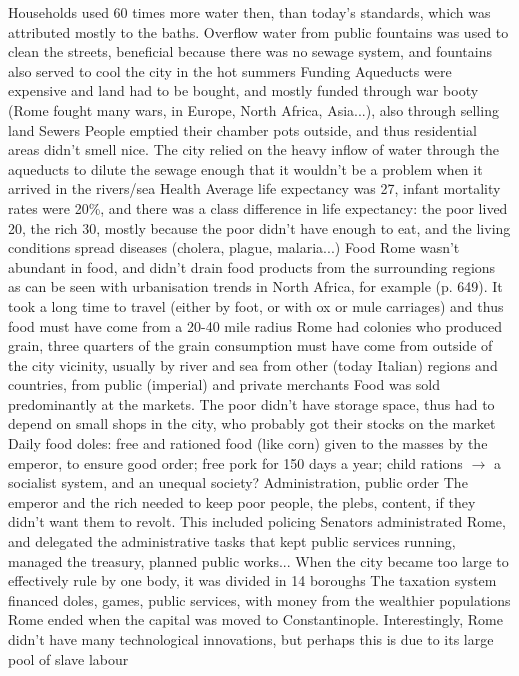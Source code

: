 \documentclass{article}
\begin{document}
\begin{outline}
		\2 Households used 60 times more water then, than today's standards, which was attributed mostly to the baths. Overflow water from public fountains was used to clean the streets, beneficial because there was no sewage system, and fountains also served to cool the city in the hot summers
	\1 Funding
		\2 Aqueducts were expensive and land had to be bought, and mostly funded through war booty (Rome fought many wars, in Europe, North Africa, Asia...), also through selling land
	\1 Sewers
		\2 People emptied their chamber pots outside, and thus residential areas didn't smell nice. The city relied on the heavy inflow of water through the aqueducts to dilute the sewage enough that it wouldn't be a problem when it arrived in the rivers/sea
	\1 Health
		\2 Average life expectancy was 27, infant mortality rates were 20\%, and there was a class difference in life expectancy: the poor lived 20, the rich 30, mostly because the poor didn't have enough to eat, and the living conditions spread diseases (cholera, plague, malaria...)
	\1 Food
		\2 Rome wasn't abundant in food, and didn't drain food products from the surrounding regions as can be seen with urbanisation trends in North Africa, for example (p. 649). It took a long time to travel (either by foot, or with ox or mule carriages) and thus food must have come from a 20-40 mile radius
		\2 Rome had colonies who produced grain, three quarters of the grain consumption must have come from outside of the city vicinity, usually by river and sea from other (today Italian) regions and countries, from public (imperial) and private merchants
		\2 Food was sold predominantly at the markets. The poor didn't have storage space, thus had to depend on small shops in the city, who probably got their stocks on the market
		\2 Daily food doles: free and rationed food (like corn) given to the masses by the emperor, to ensure good order; free pork for 150 days a year; child rations $\rightarrow$ a socialist system, and an unequal society?
	\1 Administration, public order
		\2 The emperor and the rich needed to keep poor people, the plebs, content, if they didn't want them to revolt. This included policing
		\2 Senators administrated Rome, and delegated the administrative tasks that kept public services running, managed the treasury, planned public works...
		\2 When the city became too large to effectively rule by one body, it was divided in 14 boroughs
		\2 The taxation system financed doles, games, public services, with money from the wealthier populations
	\1 Rome ended when the capital was moved to Constantinople. Interestingly, Rome didn't have many technological innovations, but perhaps this is due to its large pool of slave labour
\end{outline}
\end{document}
